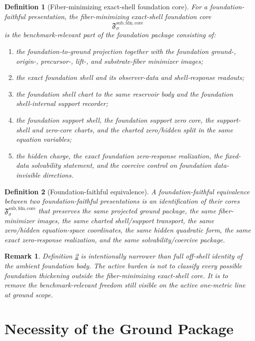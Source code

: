 \documentclass[11pt]{article}
\newcommand{\FoundationCore}{\mathfrak F^{\mathrm{sub,fdn,core}}}
\newtheorem{definition}{Definition}
\newtheorem{remark}{Remark}
\begin{document}
\begin{definition}[Fiber-minimizing exact-shell foundation core]
\label{def:core}
For a foundation-faithful presentation, the \emph{fiber-minimizing exact-shell foundation core}
\[
\FoundationCore_{\sigma}
\]
is the benchmark-relevant part of the foundation package consisting of:
\begin{enumerate}
    \item the foundation-to-ground projection together with the foundation ground-, origin-, precursor-, lift-, and substrate-fiber minimizer images;
    \item the exact foundation shell and its observer-data and shell-response readouts;
    \item the foundation shell chart to the same reservoir body and the foundation shell-internal support recorder;
    \item the foundation support shell, the foundation support zero core, the support-shell and zero-core charts, and the charted zero/hidden split in the same equation variables;
    \item the hidden charge, the exact foundation zero-response realization, the fixed-data solvability statement, and the coercive control on foundation data-invisible directions.
\end{enumerate}
\end{definition}

\begin{definition}[Foundation-faithful equivalence]
\label{def:equiv}
A \emph{foundation-faithful equivalence} between two foundation-faithful presentations is an identification of their cores \(\FoundationCore_{\sigma}\) that preserves the same projected ground package, the same fiber-minimizer images, the same charted shell/support transport, the same zero/hidden equation-space coordinates, the same hidden quadratic form, the same exact zero-response realization, and the same solvability/coercive package.
\end{definition}

\begin{remark}
Definition \ref{def:equiv} is intentionally narrower than full off-shell identity of the ambient foundation body. The active burden is not to classify every possible foundation thickening outside the fiber-minimizing exact-shell core. It is to remove the benchmark-relevant freedom still visible on the active one-metric line at ground scope.
\end{remark}

\section{Necessity of the Ground Package}
\end{document}
